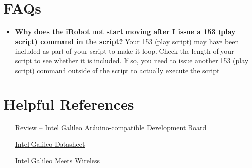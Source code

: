 \documentclass[11pt]{article} %
\begin{document}
\section{FAQs}
\begin{itemize}
\item \textbf{Why does the iRobot not start moving after I issue a 153 (play script) command in the script?} Your 153 (play script) may have been included as part of your script to make it loop. Check the length of your script to see whether it is included. If so, you need to issue another 153 (play script) command outside of the script to actually execute the script.
\end{itemize}

\section{Helpful References}
\begin{itemize}
\item [\href{http://tronixstuff.com/2014/02/12/review-intel-galileo-arduino-compatible-development-board/}{Review – Intel Galileo Arduino-compatible Development Board}]
\item [\href{http://www.intel.com/newsroom/kits/quark/galileo/pdfs/Intel_Galileo_Datasheet.pdf}{Intel Galileo Datasheet}]
\item [\href{http://www.malinov.com/Home/sergey-s-blog/intelgalileo-addingwifi}{Intel Galileo Meets Wireless}]
\end{itemize}

\end{document}
